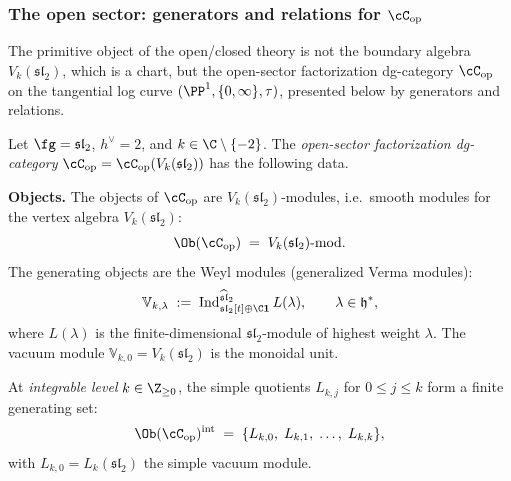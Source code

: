 \subsubsection{The open sector: generators and relations for
 \texorpdfstring{$\cC_{\mathrm{op}}$}{C\_op}}
\label{subsubsec:benchmark-open-sector}

The primitive object of the open/closed theory is not the
boundary algebra $V_k(\mathfrak{sl}_2)$, which is a chart,
but the open-sector factorization dg-category
$\cC_{\mathrm{op}}$ on the tangential log curve
$(\PP^1, \{0,\infty\}, \tau)$, presented below by generators
and relations.

\begin{definition}
\label{def:benchmark-Cop-sl2}
Let $\fg = \mathfrak{sl}_2$, $h^\vee = 2$, and
$k \in \C \setminus \{-2\}$. The \emph{open-sector
factorization dg-category}
$\cC_{\mathrm{op}} = \cC_{\mathrm{op}}(V_k(\mathfrak{sl}_2))$
has the following data.

\medskip\noindent
\textbf{Objects.}
The objects of $\cC_{\mathrm{op}}$ are
$V_k(\mathfrak{sl}_2)$-modules, i.e.\ smooth modules for the
vertex algebra $V_k(\mathfrak{sl}_2)$:
\begin{equation}\label{eq:benchmark-Cop-objects}
 \Ob(\cC_{\mathrm{op}})
 \;=\;
 V_k(\mathfrak{sl}_2)\text{-}\mathrm{mod}.
\end{equation}
The generating objects are the Weyl modules
(generalized Verma modules):
\begin{equation}\label{eq:benchmark-Cop-generators}
 \mathbb{V}_{k,\lambda}
 \;:=\;
 \operatorname{Ind}_{\mathfrak{sl}_2[t] \oplus \C\mathbf{1}}^{\widehat{\mathfrak{sl}}_2}
 L(\lambda),
 \qquad \lambda \in \mathfrak{h}^*,
\end{equation}
where $L(\lambda)$ is the finite-dimensional
$\mathfrak{sl}_2$-module of highest weight $\lambda$.
The vacuum module $\mathbb{V}_{k,0} = V_k(\mathfrak{sl}_2)$
is the monoidal unit.

At \emph{integrable level} $k \in \Z_{\ge 0}$, the simple
quotients $L_{k,j}$ for $0 \le j \le k$ form a finite
generating set:
\begin{equation}\label{eq:benchmark-Cop-integrable-objects}
 \Ob(\cC_{\mathrm{op}})^{\mathrm{int}}
 \;=\;
 \{L_{k,0},\; L_{k,1},\; \ldots,\; L_{k,k}\},
\end{equation}
with $L_{k,0} = L_k(\mathfrak{sl}_2)$ the simple vacuum module.


\end{definition}
